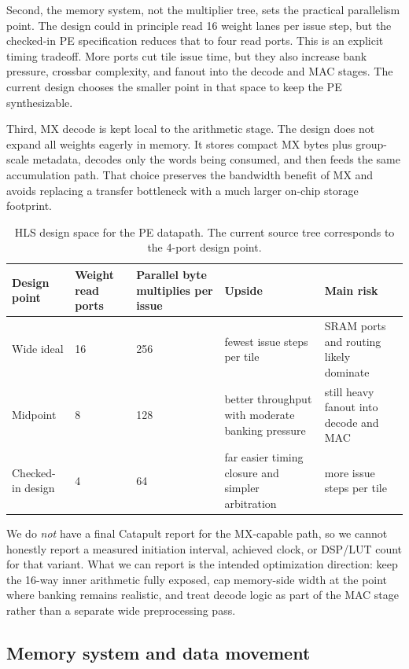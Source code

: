 \documentclass[11pt,a4paper]{article}
\begin{document}
Second, the memory system, not the multiplier tree, sets the practical parallelism point. The design could in principle read 16 weight lanes per issue step, but the checked-in PE specification reduces that to four read ports. This is an explicit timing tradeoff. More ports cut tile issue time, but they also increase bank pressure, crossbar complexity, and fanout into the decode and MAC stages. The current design chooses the smaller point in that space to keep the PE synthesizable.

Third, MX decode is kept local to the arithmetic stage. The design does not expand all weights eagerly in memory. It stores compact MX bytes plus group-scale metadata, decodes only the words being consumed, and then feeds the same accumulation path. That choice preserves the bandwidth benefit of MX and avoids replacing a transfer bottleneck with a much larger on-chip storage footprint.

\begin{table}[h!]
\centering
\small
\begin{tabular}{L{2.8cm}C{1.5cm}C{2.0cm}L{3.1cm}L{2.7cm}}
\toprule
\textbf{Design point} & \textbf{Weight read ports} & \textbf{Parallel byte multiplies per issue} & \textbf{Upside} & \textbf{Main risk} \\
\midrule
Wide ideal & 16 & 256 & fewest issue steps per tile & SRAM ports and routing likely dominate \\
Midpoint & 8 & 128 & better throughput with moderate banking pressure & still heavy fanout into decode and MAC \\
Checked-in design & 4 & 64 & far easier timing closure and simpler arbitration & more issue steps per tile \\
\bottomrule
\end{tabular}
\caption{HLS design space for the PE datapath. The current source tree corresponds to the 4-port design point.}
\label{tab:hls-design-space}
\end{table}

We do \emph{not} have a final Catapult report for the MX-capable path, so we cannot honestly report a measured initiation interval, achieved clock, or DSP/LUT count for that variant. What we can report is the intended optimization direction: keep the 16-way inner arithmetic fully exposed, cap memory-side width at the point where banking remains realistic, and treat decode logic as part of the MAC stage rather than a separate wide preprocessing pass.

\subsection{Memory system and data movement}
\end{document}
